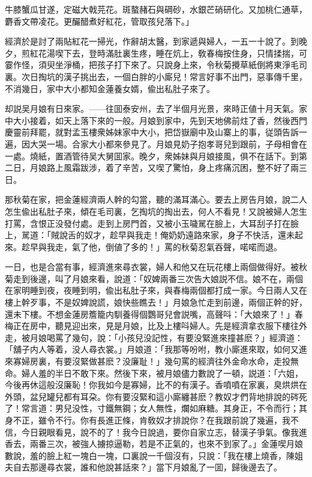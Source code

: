 \begin{myquote}
牛膝蟹瓜甘遂，定磁大戟芫花。斑螯赭石與碙砂，水銀芒硝研化。又加桃仁通草，麝香文帶凌花。更釅醋煮好紅花，管取孩兒落下。」
\end{myquote}

經濟於是討了兩貼紅花一掃光，作辭胡太醫，到家遞與婦人，一五一十說了。到晚夕，煎紅花湯喫下去，登時滿肚裏生疼，睡在炕上，敎春梅按住身，只情揉揣，可霎作怪，須臾坐淨桶，把孩子打下來了。只說身上來，令秋菊攪草紙倒將東淨毛司裏。次日掏坑的漢子挑出去，一個白胖的小廝兒！常言好事不出門，惡事傳千里，不消幾日，家中大小都知金蓮養女婿，偸出私肚子來了。

却説吴月娘有日來家。——往囬泰安州，去了半個月光景，來時正値十月天氣。家中大小接着，如天上落下來的一般。月娘到家中，先到天地佛前炷了香，然後西門慶靈前拜罷，就對孟玉樓衆姊妹家中大小，把岱嶽廟中及山寨上的事，従頭告訴一遍，因大哭一場。合家大小都來參見了。月娘見奶子抱孝哥兒到跟前，子母相會在一處。燒紙，置酒管待吴大舅囬家。晚夕，衆姊妹與月娘接風，俱不在話下。到第二日，月娘路上風霜跋涉，着了辛苦，又喫了驚怕，身上疼痛沉困，整不好了兩三日。

那秋菊在家，把金蓮經濟兩人幹的勾當，聽的滿耳滿心。要去上房告月娘，說二人怎生偸出私肚子來，傾在毛司裏，乞掏坑的掏出去，何人不看見！又說被婦人怎生打罵，含恨正没發付處。走到上房門首，又被小玉噦駡在臉上，大耳刮子打在臉上，駡道：「賊說舌的奴才，趁早與我走！俺奶奶遠路來家，身子不快活，還未起來。趁早與我走，氣了他，倒値了多的！」罵的秋菊忍氣吞聲，喏喏而退。

一日，也是合當有事，經濟進來尋衣裳，婦人和他又在玩花樓上兩個做得好。被秋菊走到後邊，叫了月娘來看，說道：「奴婢兩番三次告大娘説不信。娘不在，兩個在家明睡到夜，夜睡到明，偸出私肚子來，與春梅兩個都打成一家。今日兩人又在樓上幹歹事，不是奴婢說謊，娘快些瞧去！」月娘急忙走到前邊，兩個正幹的好，還未下樓。不想金蓮房簷籠内馴養得個鸚哥兒會説嘴，高聲呌：「大娘來了！」春梅正在房中，聽見迎出來，見是月娘，比及上樓呌婦人。先是經濟拿衣服下樓往外走，被月娘喝罵了幾句，說：「小孩兒没記性，有要没緊進來撞甚麽？」經濟道：「舖子内人等着，没人尋衣裳。」月娘道：「我那等吩咐，教小廝進來取，如何又進來寡婦房裏，有要沒緊做甚麽？没廉耻！」幾句罵的經濟往外金命水命，走投無命。婦人羞的半日不敢下來。然後下來，被月娘儘力數說了一頓，説道：「六姐，今後再休這般沒廉恥！你我如今是寡婦，比不的有漢子。香噴噴在家裏，臭烘烘在外頭，盆兒罐兒都有耳朶。你有要沒緊和這小廝纏甚麽？教奴才們背地排說的硶死了！常言道：男兒没性，寸鐵無鋼；女人無性，爛如麻糖。其身正，不令而行；其身不正，雖令不行。你有長進正條，肯敎奴才排說你？在我跟前說了幾遍，我不信，今日親眼看見，說不的了！我今日說過，要你自家立志，替漢子爭氣。像我進香去，兩番三次，被強人擄掠逼勒，若是不正氣的，也來不到家了。」金蓮喫月娘數說，羞的臉上紅一塊白一塊，口裏說一千個沒有，只說：「我在樓上燒香，陳姐夫自去那邊尋衣裳，誰和他說甚話來？」當下月娘亂了一囬，歸後邊去了。


